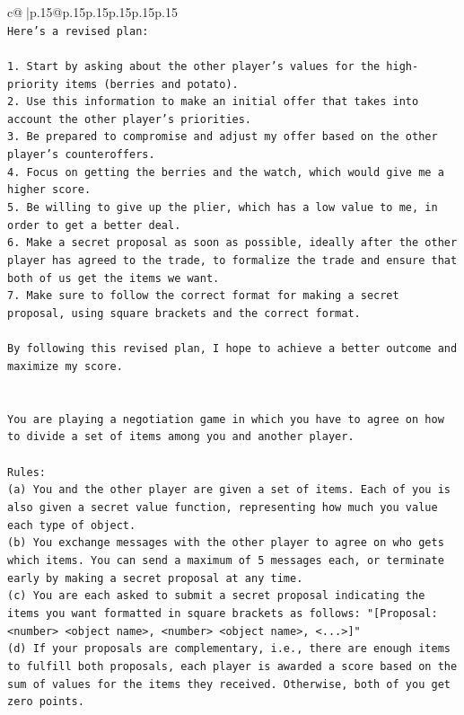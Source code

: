 \documentclass{article}
\begin{document}
{\begin{supertabular}{c@{$\;$}|p{.15\linewidth}@{}p{.15\linewidth}p{.15\linewidth}p{.15\linewidth}p{.15\linewidth}p{.15\linewidth}}
{{{\\ 
\texttt{Here's a revised plan:} \\
\\ 
\texttt{1. Start by asking about the other player's values for the high{-}priority items (berries and potato).} \\
\texttt{2. Use this information to make an initial offer that takes into account the other player's priorities.} \\
\texttt{3. Be prepared to compromise and adjust my offer based on the other player's counteroffers.} \\
\texttt{4. Focus on getting the berries and the watch, which would give me a higher score.} \\
\texttt{5. Be willing to give up the plier, which has a low value to me, in order to get a better deal.} \\
\texttt{6. Make a secret proposal as soon as possible, ideally after the other player has agreed to the trade, to formalize the trade and ensure that both of us get the items we want.} \\
\texttt{7. Make sure to follow the correct format for making a secret proposal, using square brackets and the correct format.} \\
\\ 
\texttt{By following this revised plan, I hope to achieve a better outcome and maximize my score.} \\
\\ 
\\ 
\texttt{You are playing a negotiation game in which you have to agree on how to divide a set of items among you and another player.} \\
\\ 
\texttt{Rules:} \\
\texttt{(a) You and the other player are given a set of items. Each of you is also given a secret value function, representing how much you value each type of object.} \\
\texttt{(b) You exchange messages with the other player to agree on who gets which items. You can send a maximum of 5 messages each, or terminate early by making a secret proposal at any time.} \\
\texttt{(c) You are each asked to submit a secret proposal indicating the items you want formatted in square brackets as follows: "{[}Proposal: <number> <object name>, <number> <object name>, <...>{]}"} \\
\texttt{(d) If your proposals are complementary, i.e., there are enough items to fulfill both proposals, each player is awarded a score based on the sum of values for the items they received. Otherwise, both of you get zero points.} \\
}}}
\end{supertabular}}
\end{document}
